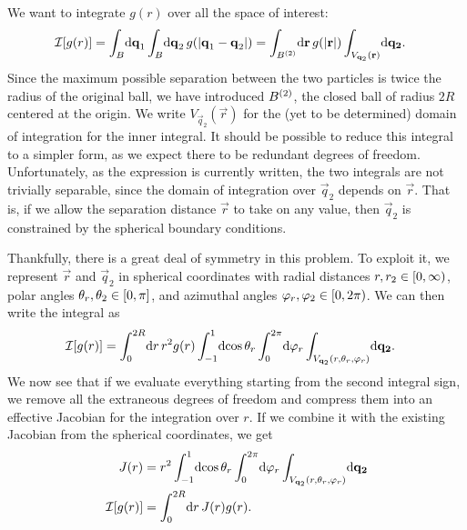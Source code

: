 We want to integrate $g(r)$ over all the space of interest:
\begin{align}
	\mathcal{I}[g(r)]
	&= \int_\ball\! \dif \vec{q}_1 \int_\ball\! \dif \vec{q}_2 \, g(\abs[0]{\vec{q}_1 - \vec{q}_2})
	= \int_{\ball^{(2)}}\! \dif \vec{r} \, g(\abs[0]{\vec{r}}) \int_{V_{\vec{q}_2}(\vec{r})}\! \dif \vec{q_2}.
\end{align}
Since the maximum possible separation between the two particles is twice the radius of the original ball, we have introduced $B^{(2)}$, the closed ball of radius $2 R$ centered at the origin.
We write $V_{\vec{q}_2}(\vec{r})$ for the (yet to be determined) domain of integration for the inner integral.
It should be possible to reduce this integral to a simpler form, as we expect there to be redundant degrees of freedom.
Unfortunately, as the expression is currently written, the two integrals are not trivially separable, since the domain of integration over $\vec{q}_2$ depends on $\vec{r}$.
That is, if we allow the separation distance $\vec{r}$ to take on any value, then $\vec{q}_2$ is constrained by the spherical boundary conditions.

Thankfully, there is a great deal of symmetry in this problem.
To exploit it, we represent $\vec{r}$ and $\vec{q}_2$ in spherical coordinates with radial distances $r, r_2 \in \intco{0, \infty}$, polar angles $\theta_r, \theta_2 \in \intcc{0, \pi}$, and azimuthal angles $\phi_r, \phi_2 \in \intco{0, 2 \pi}$.
We can then write the integral as
\begin{align}
	\mathcal{I}[g(r)]
	&= \int_0^{2 R}\! \dif r \, r^2 g(r) \int_{-1}^1\! \dif \cos{\theta_r} \int_0^{2 \pi}\! \dif \phi_r
		\int_{V_{\vec{q}_2}(r, \theta_r, \phi_r)}\! \dif \vec{q_2}.
\end{align}
We now see that if we evaluate everything starting from the second integral sign, we remove all the extraneous degrees of freedom and compress them into an effective Jacobian for the integration over $r$.
If we combine it with the existing Jacobian from the spherical coordinates, we get
\begin{subequations}
\begin{align}
	J(r)
	&= r^2 \int_{-1}^1\! \dif \cos{\theta_r} \int_0^{2 \pi}\! \dif \phi_r
		\int_{V_{\vec{q}_2}(r, \theta_r, \phi_r)}\! \dif \vec{q_2} \\
	\mathcal{I}[g(r)]
	&= \int_0^{2 R}\! \dif r \, J(r) g(r).
\end{align}
\end{subequations}


